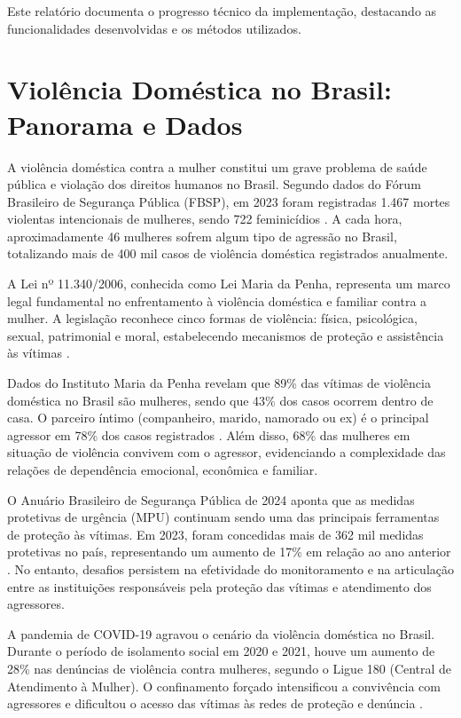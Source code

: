 \par Este relatório documenta o progresso técnico da implementação, destacando as funcionalidades desenvolvidas e os métodos utilizados.

\section{Violência Doméstica no Brasil: Panorama e Dados}

\par A violência doméstica contra a mulher constitui um grave problema de saúde pública e violação dos direitos humanos no Brasil. Segundo dados do Fórum Brasileiro de Segurança Pública (FBSP), em 2023 foram registradas 1.467 mortes violentas intencionais de mulheres, sendo 722 feminicídios \cite{fbsp2024}. A cada hora, aproximadamente 46 mulheres sofrem algum tipo de agressão no Brasil, totalizando mais de 400 mil casos de violência doméstica registrados anualmente.

\par A Lei nº 11.340/2006, conhecida como Lei Maria da Penha, representa um marco legal fundamental no enfrentamento à violência doméstica e familiar contra a mulher. A legislação reconhece cinco formas de violência: física, psicológica, sexual, patrimonial e moral, estabelecendo mecanismos de proteção e assistência às vítimas \cite{brasil2006}.

\par Dados do Instituto Maria da Penha revelam que 89\% das vítimas de violência doméstica no Brasil são mulheres, sendo que 43\% dos casos ocorrem dentro de casa. O parceiro íntimo (companheiro, marido, namorado ou ex) é o principal agressor em 78\% dos casos registrados \cite{imp2023}. Além disso, 68\% das mulheres em situação de violência convivem com o agressor, evidenciando a complexidade das relações de dependência emocional, econômica e familiar.

\par O Anuário Brasileiro de Segurança Pública de 2024 aponta que as medidas protetivas de urgência (MPU) continuam sendo uma das principais ferramentas de proteção às vítimas. Em 2023, foram concedidas mais de 362 mil medidas protetivas no país, representando um aumento de 17\% em relação ao ano anterior \cite{fbsp2024}. No entanto, desafios persistem na efetividade do monitoramento e na articulação entre as instituições responsáveis pela proteção das vítimas e atendimento dos agressores.

\par A pandemia de COVID-19 agravou o cenário da violência doméstica no Brasil. Durante o período de isolamento social em 2020 e 2021, houve um aumento de 28\% nas denúncias de violência contra mulheres, segundo o Ligue 180 (Central de Atendimento à Mulher). O confinamento forçado intensificou a convivência com agressores e dificultou o acesso das vítimas às redes de proteção e denúncia \cite{fbsp2021}.

